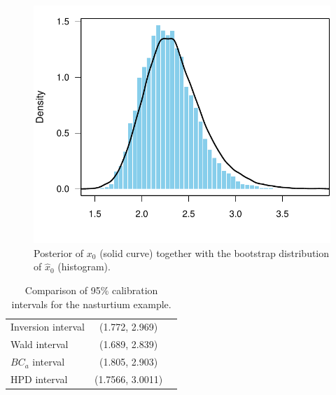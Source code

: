 \documentclass[cmfont,usenames,dvipsnames,leqno]{afit-etd}\usepackage[]{graphicx}\usepackage[]{color}
\makeatletter
\def\maxwidth{ %
  \ifdim\Gin@nat@width>\linewidth
    \linewidth
  \else
    \Gin@nat@width
  \fi
}
\newenvironment{knitrout}{}{} %
\renewenvironment{knitrout}{\begin{singlespace}}{\end{singlespace}}
\newcommand{\wh}[1]{\ensuremath{\widehat{#1}}}
\makeatother
\begin{document}
\begin{knitrout}
\color{fgcolor}\begin{figure}[!htb]

\includegraphics[width=\maxwidth]{figure/nasturtium-post-boot} \caption[Posterior and bootstrap results for the nasturtium example]{Posterior of $x_0$ (solid curve) together with the bootstrap distribution of $\wh{x}_0$ (histogram).\label{fig:nasturtium-post-boot}}
\end{figure}


\end{knitrout}


\begin{table}
\centering
\caption[ 95\% calibration intervals for the nasturtium data]{Comparison of 95\% calibration intervals for the nasturtium example. \label{tab:results}}
\begin{tabular}{lcc}
  \toprule
  Inversion interval & (1.772, 2.969) \\ 
  Wald interval      & (1.689, 2.839) \\ 
  $BC_a$ interval    & (1.805, 2.903) \\ 
  HPD interval       & (1.7566, 3.0011) \\ 
  \bottomrule
\end{tabular}
\end{table}



\end{document}
